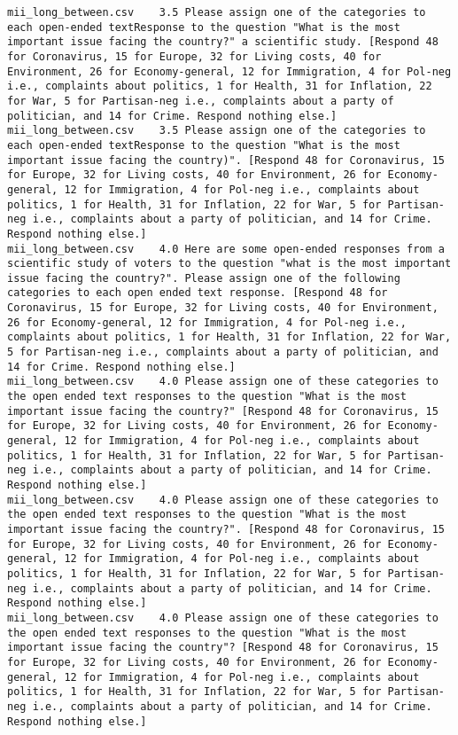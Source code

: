 \begin{lstlisting}
mii_long_between.csv	3.5	Please assign one of the categories to each open-ended textResponse to the question "What is the most important issue facing the country?" a scientific study. [Respond 48 for Coronavirus, 15 for Europe, 32 for Living costs, 40 for Environment, 26 for Economy-general, 12 for Immigration, 4 for Pol-neg i.e., complaints about politics, 1 for Health, 31 for Inflation, 22 for War, 5 for Partisan-neg i.e., complaints about a party of politician, and 14 for Crime. Respond nothing else.]
mii_long_between.csv	3.5	Please assign one of the categories to each open-ended textResponse to the question "What is the most important issue facing the country)". [Respond 48 for Coronavirus, 15 for Europe, 32 for Living costs, 40 for Environment, 26 for Economy-general, 12 for Immigration, 4 for Pol-neg i.e., complaints about politics, 1 for Health, 31 for Inflation, 22 for War, 5 for Partisan-neg i.e., complaints about a party of politician, and 14 for Crime. Respond nothing else.]
mii_long_between.csv	4.0	Here are some open-ended responses from a scientific study of voters to the question "what is the most important issue facing the country?". Please assign one of the following categories to each open ended text response. [Respond 48 for Coronavirus, 15 for Europe, 32 for Living costs, 40 for Environment, 26 for Economy-general, 12 for Immigration, 4 for Pol-neg i.e., complaints about politics, 1 for Health, 31 for Inflation, 22 for War, 5 for Partisan-neg i.e., complaints about a party of politician, and 14 for Crime. Respond nothing else.]
mii_long_between.csv	4.0	Please assign one of these categories to the open ended text responses to the question "What is the most important issue facing the country?" [Respond 48 for Coronavirus, 15 for Europe, 32 for Living costs, 40 for Environment, 26 for Economy-general, 12 for Immigration, 4 for Pol-neg i.e., complaints about politics, 1 for Health, 31 for Inflation, 22 for War, 5 for Partisan-neg i.e., complaints about a party of politician, and 14 for Crime. Respond nothing else.]
mii_long_between.csv	4.0	Please assign one of these categories to the open ended text responses to the question "What is the most important issue facing the country?". [Respond 48 for Coronavirus, 15 for Europe, 32 for Living costs, 40 for Environment, 26 for Economy-general, 12 for Immigration, 4 for Pol-neg i.e., complaints about politics, 1 for Health, 31 for Inflation, 22 for War, 5 for Partisan-neg i.e., complaints about a party of politician, and 14 for Crime. Respond nothing else.]
mii_long_between.csv	4.0	Please assign one of these categories to the open ended text responses to the question "What is the most important issue facing the country"? [Respond 48 for Coronavirus, 15 for Europe, 32 for Living costs, 40 for Environment, 26 for Economy-general, 12 for Immigration, 4 for Pol-neg i.e., complaints about politics, 1 for Health, 31 for Inflation, 22 for War, 5 for Partisan-neg i.e., complaints about a party of politician, and 14 for Crime. Respond nothing else.]

\end{lstlisting}

